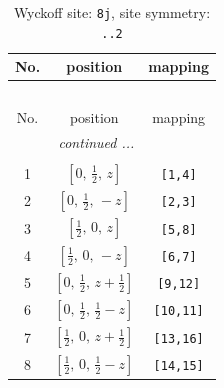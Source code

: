 \documentclass[fleqn,8pt]{jsarticle}
\begin{document}
\begin{longtable}{ccc}
\caption{Wyckoff site: {\tt 8j}, site symmetry: {\tt ..2}}
 \\
 \hline \hline
No. & position & mapping \\ \hline \endfirsthead

\multicolumn{2}{l}{\tablename\ \thetable{}} \\
 \hline \hline
No. & position & mapping \\ \hline \endhead

 \hline \hline
\multicolumn{2}{r}{\footnotesize\it continued ...} \\ \endfoot

 \hline \hline
\multicolumn{2}{r}{} \\ \endlastfoot

1 & $\left[ 0,\, \frac{1}{2},\, z \right]$ & {\tt [1,4]} \\ \hline
2 & $\left[ 0,\, \frac{1}{2},\, - z \right]$ & {\tt [2,3]} \\ \hline
3 & $\left[ \frac{1}{2},\, 0,\, z \right]$ & {\tt [5,8]} \\ \hline
4 & $\left[ \frac{1}{2},\, 0,\, - z \right]$ & {\tt [6,7]} \\ \hline
5 & $\left[ 0,\, \frac{1}{2},\, z + \frac{1}{2} \right]$ & {\tt [9,12]} \\ \hline
6 & $\left[ 0,\, \frac{1}{2},\, \frac{1}{2} - z \right]$ & {\tt [10,11]} \\ \hline
7 & $\left[ \frac{1}{2},\, 0,\, z + \frac{1}{2} \right]$ & {\tt [13,16]} \\ \hline
8 & $\left[ \frac{1}{2},\, 0,\, \frac{1}{2} - z \right]$ & {\tt [14,15]} \\
\end{longtable}
\renewcommand{\arraystretch}{1.2}
\end{document}
